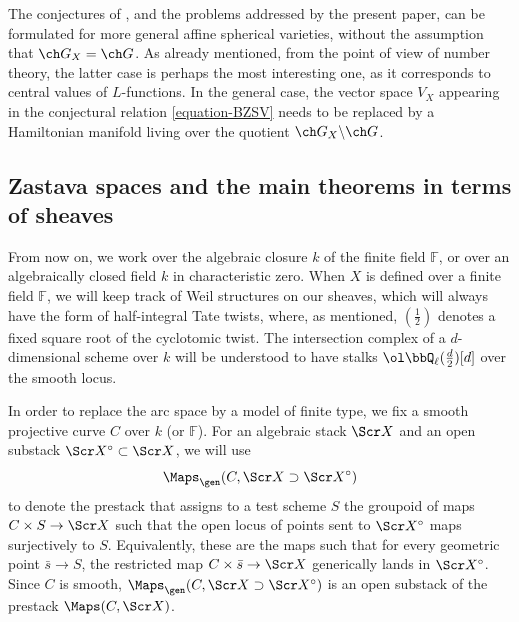 \documentclass[final]{amsart}
\theoremstyle{remark}
\theoremstyle{definition}
\numberwithin{equation}{section}
\begin{document}
The conjectures of \cite{BZSV}, and the problems addressed by the present paper, can be formulated for more general affine spherical varieties, without the assumption that $\ch G_X = \ch G$. As already mentioned, from the point of view of number theory, the latter case is perhaps the most interesting one, as it corresponds to central values of $L$-functions. In the general case, the vector space $V_X$ appearing in the conjectural relation \eqref{equation-BZSV} needs to be replaced by a Hamiltonian manifold living over the quotient $\ch G_X\backslash \ch G$.


\subsection{Zastava spaces and the main theorems in terms of sheaves}
\label{subsection-introduction-global}

From now on, we work over the algebraic closure $k$ of the finite field $\mathbb F$, or over an algebraically closed field $k$ in characteristic zero. When $X$ is defined over a finite field $\mathbb F$, we will keep track of Weil structures on our sheaves, which will always have the form of half-integral Tate twists, where, as mentioned, $(\frac{1}{2})$ denotes a fixed square root of the cyclotomic twist. The intersection complex of a $d$-dimensional scheme over $k$ will be understood to have stalks $\ol\bbQ_\ell (\frac{d}{2})[d]$ over the smooth locus. 

In order to replace the arc space by a model of finite type, we fix a smooth projective curve $C$ over $k$ (or $\mathbb F$). For an algebraic stack $\Scr X$ and an open substack $\Scr X^\circ \subset \Scr X$,
we will use 
\[ \Maps_\gen(C, \Scr X \supset \Scr X^\circ) \]
to denote the prestack that assigns to a test scheme $S$
the groupoid of maps $C\times S \to \Scr X$
such that the open locus of points sent to $\Scr X^\circ$ 
maps surjectively to $S$. 
Equivalently, these are the maps such that for every geometric point $\bar s \to S$, 
the restricted map $C\times \bar s \to \Scr X$ generically lands in $\Scr X^\circ$.
Since $C$ is smooth, $\Maps_\gen(C, \Scr X \supset \Scr X^\circ)$ is 
an open substack of the prestack $\Maps(C,\Scr X)$. 

\smallskip
\end{document}
